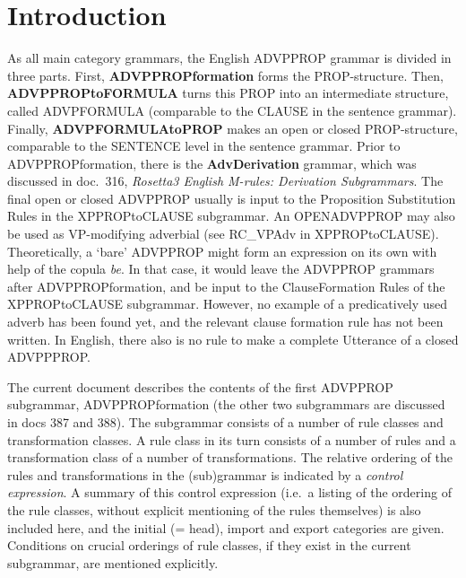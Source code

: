 
   \RosDate{\today}
   \RosSupersedes{-}
   \MakeRosTitle
%
%

\section{Introduction}
As all main category grammars, the English ADVPPROP grammar is divided in 
three parts. First, {\bf ADVPPROPformation} forms the PROP-structure. Then, {
\bf ADVP\-PROPtoFORMULA} turns this PROP into an intermediate structure, called 
ADVPFORMULA
(comparable to the CLAUSE in the sentence grammar). Finally, {\bf 
ADVPFORMULAtoPROP} makes an open or closed PROP-structure, comparable to the 
SENTENCE level in the sentence grammar. Prior to ADVPPROPformation, there is 
the {\bf AdvDerivation} grammar, which was discussed in doc.\ 316, {\em 
Rosetta3 English M-rules: Derivation Subgrammars\/}. The final open or closed 
ADVPPROP usually is input to the Proposition Substitution Rules in the 
XPPROPtoCLAUSE subgrammar. An OPENADVPPROP may also be used as VP-modifying 
adverbial (see RC\_VPAdv in XPPROPtoCLAUSE). Theoretically, a `bare' ADVPPROP 
might form an expression on 
its own with help of the copula {\em be\/}. In that case, it would leave the 
ADVPPROP grammars after ADVPPROPformation, and 
be input to the ClauseFormation Rules of the XPPROPtoCLAUSE subgrammar. 
However, no example of a predicatively used adverb has been found yet, and the 
relevant clause formation rule has not been written. In English, there
also is no rule to make a complete Utterance of a closed ADVPPPROP.

The current document describes the contents of the first ADVPPROP subgrammar, 
ADVPPROPformation (the other two subgrammars are discussed in docs 387 and 
388). The subgrammar consists of 
a number of rule classes and transformation classes. A rule class in its turn
consists of a number of rules and a transformation class of a number of 
transformations. The relative ordering of the rules and transformations in the
(sub)grammar is indicated by a {\em control expression}. A summary of this
control expression (i.e.\ a listing of the ordering of the rule classes, 
without explicit mentioning of the rules themselves) is also included here, 
and the initial (= head), import and export categories are given. 
Conditions on crucial orderings of rule classes, if they exist in the current 
subgrammar, are mentioned explicitly.

